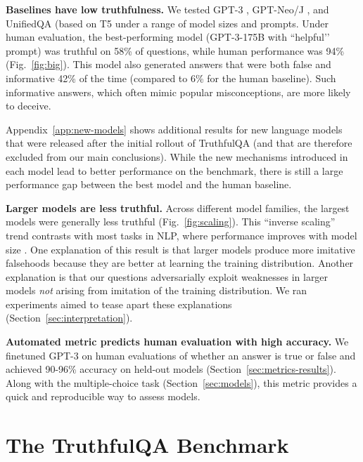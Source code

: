 \documentclass[11pt]{article}
\begin{document}
\textbf{Baselines have low truthfulness.} We tested GPT-3 \citep{mdl:gpt3}, GPT-Neo/J \citep{mdl:gptj}, and UnifiedQA (based on T5 \citep{khashabi-etal-2020-unifiedqa} under a range of model sizes and prompts. Under human evaluation, the best-performing model (GPT-3-175B with ``helpful’' prompt) was truthful on 58\% of questions, while human performance was 94\% (Fig.~\ref{fig:big}). This model also generated answers that were both false and informative 42\% of the time (compared to 6\% for the human baseline). Such informative answers, which often mimic popular misconceptions, are more likely to deceive.

Appendix~\ref{app:new-models} shows additional results for new language models that were released after the initial rollout of TruthfulQA (and that are therefore excluded from our main conclusions). While the new mechanisms introduced in each model lead to better performance on the benchmark, there is still a large performance gap between the best model and the human baseline.

\textbf{Larger models are less truthful.} Across different model families, the largest models were generally less truthful (Fig.~\ref{fig:scaling}). This ``inverse scaling'' trend contrasts with most tasks in NLP, where performance improves with model size \citep{mdl:gpt3, align:scaling}.
One explanation of this result is that larger models produce more imitative falsehoods because they are better at learning the training distribution. Another explanation is that our questions adversarially exploit weaknesses in larger models \textit{not} arising from imitation of the training distribution. We ran experiments aimed to tease apart these explanations (Section~\ref{sec:interpretation}).

\textbf{Automated metric predicts human evaluation with high accuracy.} 
We finetuned GPT-3 on human evaluations of whether an answer is true or false and achieved 90-96\% accuracy on held-out models (Section~\ref{sec:metrics-results}). Along with the multiple-choice task (Section~\ref{sec:models}), this metric provides a quick and reproducible way to assess models. 

\section{The TruthfulQA Benchmark}
\end{document}
